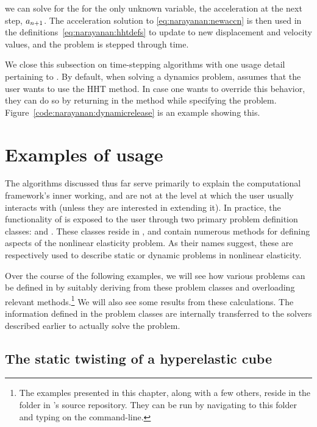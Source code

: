 \noindent we can solve for the for the only unknown variable, the
acceleration at the next step, $\mbox{$ a$}_{n+1}$. The acceleration solution
to \eqref{eq:narayanan:newaccn} is then used in the
definitions~\eqref{eq:narayanan:hhtdefs} to update to new displacement
and velocity values, and the problem is stepped through time.

We close this subsection on time-stepping algorithms with one usage
detail pertaining to \twist. By default, when solving a dynamics
problem, \twist{} assumes that the user wants to use the HHT
method. In case one wants to override this behavior, they can do so
by returning  in the  method while
specifying the problem. Figure~\ref{code:narayanan:dynamicrelease} is
an example showing this.

\section{Examples of \twist{} usage}

The algorithms discussed thus far serve primarily to explain the
computational framework's inner working, and are not at the level at
which the user usually interacts with \twist{} (unless they are
interested in extending it). In practice, the functionality of \twist{}
is exposed to the user through two primary problem definition classes:
 and . These classes
reside in , and contain numerous methods
for defining aspects of the nonlinear elasticity problem. As their
names suggest, these are respectively used to describe static or
dynamic problems in nonlinear elasticity.

Over the course of the following examples, we will see how various
problems can be defined in \twist{} by suitably deriving from these
problem classes and overloading relevant methods.\footnote{The
examples presented in this chapter, along with a few others, reside in
the  folder in \twist's source repository. They can
be run by navigating to this folder and typing  on the command-line.} We will also see some results
from these calculations. The information defined in the problem
classes are internally transferred to the solvers described earlier to
actually solve the problem.

\subsection{The static twisting of a hyperelastic cube}

